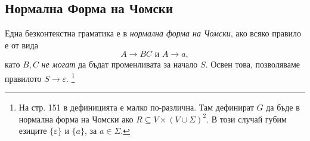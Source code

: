 \subsection{Нормална Форма на Чомски}

\begin{dfn}
Една безконтекстна граматика е в {\em нормална форма на Чомски}, ако
всяко правило е от вида
\[A \rightarrow BC\mbox{ и }A \rightarrow a,\]
като $B, C$ {\em не могат} да бъдат променливата за начало $S$.
Освен това, позволяваме правилото $S\to\varepsilon$.
\footnote{На стр. 151 в \cite{papadimitriou} дефиницията е малко по-различна.
Там дефинират $G$ да бъде в нормална форма на Чомски ако $R \subseteq V\times(V\cup\Sigma)^2$.
В този случай губим езиците $\{\varepsilon\}$ и $\{a\}$, за $a\in\Sigma$.}
\end{dfn}

